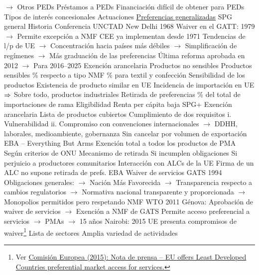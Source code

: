 \documentclass{nuevotema}
\begin{document}
\begin{esquemal}
				\4[] $\to$ Otros PEDs
				\4 Préstamos a PEDs
				\4[] Financiación difícil de obtener para PEDs
				\4[] Tipos de interés concesionales
		\2 Actuaciones
			\3 \underline{Preferencias generalizadas}
			\3[] SPG general
				\4 Historia
				\4[] Conferencia UNCTAD New Delhi 1968
				\4[] Waiver en el GATT: 1979
				\4[] $\to$ Permite excepción a NMF
				\4[] CEE ya implementan desde 1971
				\4[] Tendencias de l/p de UE
				\4[] $\to$ Concentración hacia países más débiles
				\4[] $\to$ Simplificación de regímenes
				\4[] $\to$ Más graduación de las preferencias
				\4[] Última reforma aprobada en 2012
				\4[] $\to$ Para 2016--2025
				\4 Exención arancelaria
				\4[] Productos no sensibles
				\4 Productos sensibles
				\% respecto a tipo NMF
				\% para textil y confección
				\4 Sensibilidad de los productos
				\4[] Existencia de producto similar en UE
				\4[] Incidencia de importación en UE
				\4[] $\Rightarrow$ Sobre todo, productos industriales
				\4 Retirada de preferencias
				\% del total de importaciones de rama
				\4 Eligibilidad
				\4[] Renta per cápita baja
			\3 SPG+
				\4 Exención arancelaria
				\4[] Lista de productos cubiertos
				\4 Cumplimiento de dos requisitos
				\4[] i. Vulnerabilidad
				\4[] ii. Compromiso con convenciones internacionales
				\4[] $\to$ DDHH, laborales, medioambiente, gobernanza
				\4 Sin cancelar por volumen de exportación
			\3 EBA -- Everything But Arms
				\4 Exención total a todos los productos de PMA
				\4[] Según criterios de ONU
				\4 Mecanismo de retirada
				\4[] Si incumplen obligaciones
				\4[] Si perjuicio a productores comunitarios
				\4 Interacción con ALCs de la UE
				\4[] Firma de un ALC no supone retirada de prefs. EBA
			\3 Waiver de servicios
				\4 GATS 1994
				\4[] Obligaciones generales:
				\4[] $\to$ Nación Más Favorecida
				\4[] $\to$ Transparencia respecto a cambios regulatorios
				\4[] $\to$ Normativa nacional transparente y proporcionada
				\4[] $\to$ Monopolios permitidos pero respetando NMF
				\4 WTO 2011 Génova:
				\4[] Aprobación de waiver de servicios
				\4[] $\to$ Exención a NMF de GATS
				\4[] Permite acceso preferencial a servicios
				\4[] $\to$ PMAs
				\4[] $\to$ 15 años
				\4 Nairobi: 2015 UE presenta compromisos de waiver\footnote{Ver \href{https://trade.ec.europa.eu/doclib/press/index.cfm?id=1256&title=EU-offers-Least-Developed-Countries-preferential-market-access-for-services}{Comisión Europea (2015): Nota de prensa -- EU offers Least Developed Countries preferential market access for services.}}
				\4[] Lista de sectores
				\4[] Amplia variedad de actividades

\end{esquemal}
\end{document}
